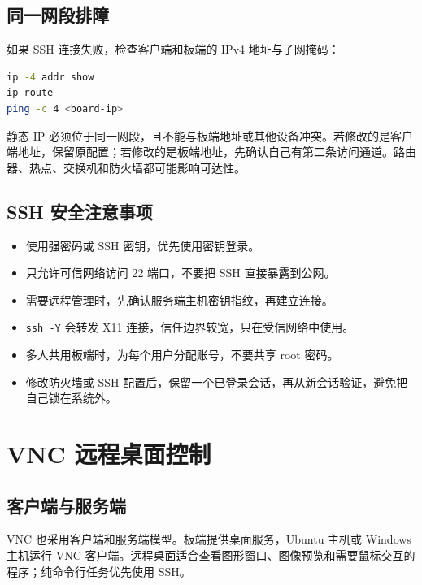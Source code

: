 \subsection{同一网段排障}\label{ux540cux4e00ux7f51ux6bb5ux6392ux969c}

如果 SSH 连接失败，检查客户端和板端的 IPv4 地址与子网掩码：

\begin{lstlisting}[language=bash]
ip -4 addr show
ip route
ping -c 4 <board-ip>
\end{lstlisting}

静态 IP
必须位于同一网段，且不能与板端地址或其他设备冲突。若修改的是客户端地址，保留原配置；若修改的是板端地址，先确认自己有第二条访问通道。路由器、热点、交换机和防火墙都可能影响可达性。

\subsection{SSH
安全注意事项}\label{ssh-ux5b89ux5168ux6ce8ux610fux4e8bux9879}

\begin{itemize}
\tightlist
\item
  使用强密码或 SSH 密钥，优先使用密钥登录。
\item
  只允许可信网络访问 22 端口，不要把 SSH 直接暴露到公网。
\item
  需要远程管理时，先确认服务端主机密钥指纹，再建立连接。
\item
  \passthrough{\lstinline!ssh -Y!} 会转发 X11
  连接，信任边界较宽，只在受信网络中使用。
\item
  多人共用板端时，为每个用户分配账号，不要共享 root 密码。
\item
  修改防火墙或 SSH
  配置后，保留一个已登录会话，再从新会话验证，避免把自己锁在系统外。
\end{itemize}

\section{VNC
远程桌面控制}\label{vnc-ux8fdcux7a0bux684cux9762ux63a7ux5236}

\subsection{客户端与服务端}\label{ux5ba2ux6237ux7aefux4e0eux670dux52a1ux7aef-1}

VNC 也采用客户端和服务端模型。板端提供桌面服务，Ubuntu 主机或 Windows
主机运行 VNC
客户端。远程桌面适合查看图形窗口、图像预览和需要鼠标交互的程序；纯命令行任务优先使用
SSH。

